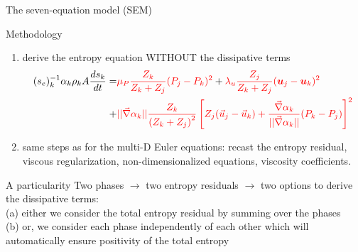 \documentclass[xcolor=dvipsnames,10pt]{beamer}
\newcommand{\grad}{\vec{\nabla}}
\newcommand{\mbold}[1]{\boldsymbol#1}
\begin{document}
\begin{frame}{The seven-equation model (SEM)}
\begin{block}{Methodology}
\begin{enumerate}
\item derive the entropy equation WITHOUT the dissipative terms
\begin{align}
(s_e)_k^{-1} \alpha_k \rho_k A \frac{d s_k}{dt} =& \textcolor{red}{\mu_P \frac{Z_k}{Z_k+Z_j} (P_j - P_k)^2} +
\textcolor{red}{ \lambda_u \frac{Z_j}{Z_k+Z_j} (\mbold u_j - \mbold u_k)^2} \nonumber \\ 
+& \textcolor{red}{|| \grad \alpha_k || \frac{Z_k }{\left( Z_k+Z_j \right)^2} \left[ Z_j (\vec{u}_j-\vec{u}_k)+\frac{\grad \alpha_k}{|| \grad \alpha_k ||}(P_k-P_j)\right]^2 }\nonumber
\end{align}
\item same steps as for the multi-D Euler equations: recast the entropy residual, viscous regularization, non-dimensionalized equations, viscosity coefficients.
\end{enumerate}
\end{block}
\begin{block}{A particularity}
Two phases $\to$ two entropy residuals $\to$ two options to derive the dissipative terms: \\
(a) either we consider the total entropy residual by summing over the phases \\
(b) or, we consider each phase independently of each other which will automatically ensure positivity of the total entropy \\
\end{block}
\end{frame}
\end{document}
